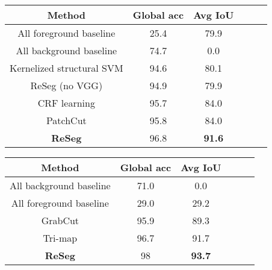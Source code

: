\documentclass[times,art10,twocolumn,latex8]{article}
\begin{document}
\begin{table*}[!ht]
\begin{minipage}{0.45\textwidth}
        \centering
        \small{\begin{tabular}{c|c|c||c|c|c}
                \multicolumn{1}{c}{Method} & \multicolumn{1}{c}{Global acc} & \multicolumn{1}{c}{\textbf{Avg IoU}}\\ \hline \hline

                All foreground baseline & 25.4 & 79.9 \\ \hline
                All background baseline & 74.7 & 0.0 \\ \hline
                Kernelized structural SVM \cite{bertelli2011kernelized} & 94.6 & 80.1 \\ \hline
                ReSeg (no VGG) & 94.9 & 79.9 \\ \hline
                CRF learning \cite{liu2015crf} & 95.7 & 84.0 \\ \hline
                PatchCut \cite{yang2015patchcut} & 95.8 & 84.0 \\ \hline
                \textbf{ReSeg} & 96.8 & \textbf{91.6} \\ \hline

            \end{tabular}
            \vspace*{0.1cm}
        }
        \caption{Weizmann Horses. Per pixel accuracy and IoU are
            reported.}
        \label{tbl:WeizmannHorses_SOTA}
    \end{minipage}
    \quad
\begin{minipage}{0.45\textwidth}
        \centering
        \small{\begin{tabular}{c|c|c||c|c|c}
                \multicolumn{1}{c}{Method} & \multicolumn{1}{c}{Global acc} & \multicolumn{1}{c}{\textbf{Avg IoU}}\\ \hline \hline

                All background baseline & 71.0 & 0.0 \\ \hline
                All foreground baseline & 29.0 & 29.2 \\ \hline
GrabCut \cite{rother2004grabcut} & 95.9 & 89.3 \\ \hline
                Tri-map \cite{Xiaomeng14} & 96.7 & 91.7 \\ \hline
                \textbf{ReSeg} & 98 & \textbf{93.7} \\ \hline

            \end{tabular}
            \vspace*{0.1cm}
        }
        \caption{Oxford Flowers. Per pixel accuracy and IoU are
            reported.}
        \label{tbl:OxfordFlowers_SOTA}
    \end{minipage}
\end{table*}
\end{document}
